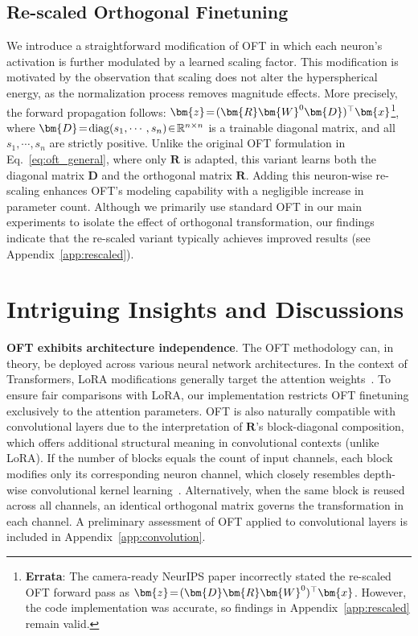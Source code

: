 \subsection{Re-scaled Orthogonal Finetuning}

We introduce a straightforward modification of OFT in which each neuron’s activation is further modulated by a learned scaling factor. This modification is motivated by the observation that scaling does not alter the hyperspherical energy, as the normalization process removes magnitude effects. More precisely, the forward propagation follows: $\thickmuskip=2mu \medmuskip=2mu\bm{z}=(\bm{R}\bm{W}^0\bm{D})^\top\bm{x}$\footnote{\textbf{Errata}: The camera-ready NeurIPS paper incorrectly stated the re-scaled OFT forward pass as $\thickmuskip=2mu \medmuskip=2mu\bm{z}=(\bm{D}\bm{R}\bm{W}^0)^\top\bm{x}$. However, the code implementation was accurate, so findings in Appendix~\ref{app:rescaled} remain valid.}, where $\thickmuskip=2mu \medmuskip=2mu \bm{D}=\text{diag}(s_1,\cdots,s_n)\in\mathbb{R}^{n\times n}$ is a trainable diagonal matrix, and all $s_1,\cdots,s_n$ are strictly positive. Unlike the original OFT formulation in Eq.~\eqref{eq:oft_general}, where only $\bm{R}$ is adapted, this variant learns both the diagonal matrix $\bm{D}$ and the orthogonal matrix $\bm{R}$. Adding this neuron-wise re-scaling enhances OFT's modeling capability with a negligible increase in parameter count. Although we primarily use standard OFT in our main experiments to isolate the effect of orthogonal transformation, our findings indicate that the re-scaled variant typically achieves improved results (see Appendix~\ref{app:rescaled}).

\section{Intriguing Insights and Discussions}

\textbf{OFT exhibits architecture independence}. The OFT methodology can, in theory, be deployed across various neural network architectures. In the context of Transformers, LoRA modifications generally target the attention weights~\cite{hulora2022}. To ensure fair comparisons with LoRA, our implementation restricts OFT finetuning exclusively to the attention parameters. OFT is also naturally compatible with convolutional layers due to the interpretation of $\bm{R}$'s block-diagonal composition, which offers additional structural meaning in convolutional contexts (unlike LoRA). If the number of blocks equals the count of input channels, each block modifies only its corresponding neuron channel, which closely resembles depth-wise convolutional kernel learning~\cite{chollet2017xception}. Alternatively, when the same block is reused across all channels, an identical orthogonal matrix governs the transformation in each channel. A preliminary assessment of OFT applied to convolutional layers is included in Appendix~\ref{app:convolution}.


